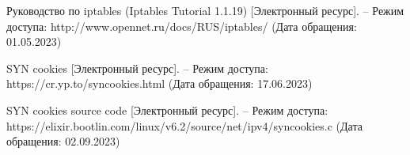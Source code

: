 \begin{thebibliography}{}
	 Руководство по iptables (Iptables Tutorial 1.1.19) [Электронный ресурс]. -- Режим доступа: http://www.opennet.ru/docs/RUS/iptables/ (Дата обращения: 01.05.2023)	
	
	 SYN cookies [Электронный ресурс]. -- Режим доступа: https://cr.yp.to/syncookies.html (Дата обращения: 17.06.2023)	
	
	 SYN cookies source code [Электронный ресурс]. -- Режим доступа: https://elixir.bootlin.com/linux/v6.2/source/net/ipv4/syncookies.c (Дата обращения: 02.09.2023)	
	
\end{thebibliography}
\endgroup

\pagebreak